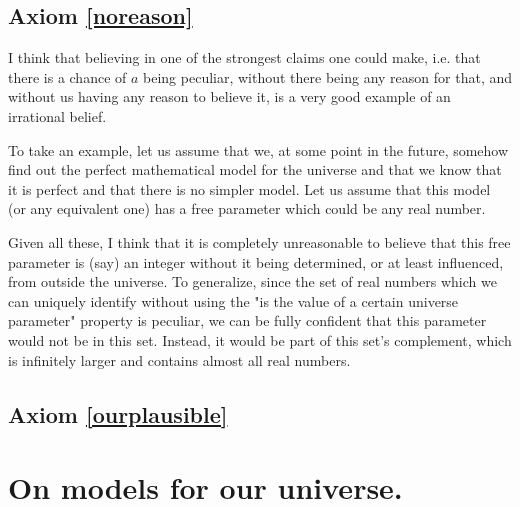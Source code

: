 \documentclass[a4paper
,draft
]{article}
\begin{document}
\subsection{Axiom \ref{noreason}}

I think that believing in one of the strongest claims one could make, i.e. that there is a chance of $a$ being peculiar, without there being any reason for that, and without us having any reason to believe it, is a very good example of an irrational belief.

To take an example, let us assume that we, at some point in the future, somehow find out the perfect mathematical model for the universe and that we know that it is perfect and that there is no simpler model. Let us assume that this model (or any equivalent one) has a free parameter which could be any real number.

Given all these, I think that it is completely unreasonable to believe that this free parameter is (say) an integer without it being determined, or at least influenced, from outside the universe. To generalize, since the set of real numbers which we can uniquely identify without using the "is the value of a certain universe parameter" property is peculiar, we can be fully confident that this parameter would not be in this set. Instead, it would be part of this set's complement, which is infinitely larger and contains almost all real numbers.



\subsection{Axiom \ref{ourplausible}}


\section{On models for our universe.}
\end{document}
